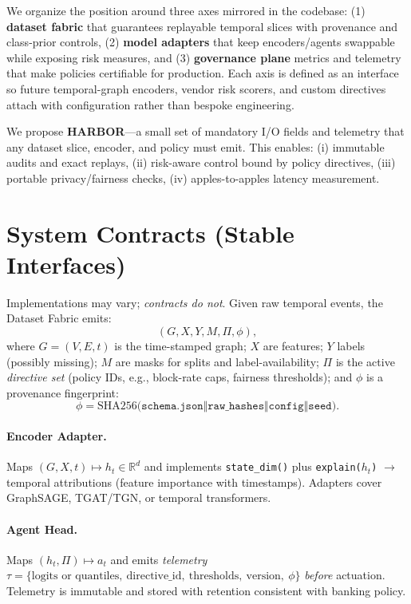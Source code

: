 \documentclass[letterpaper]{article}
\begin{document}
We organize the position around three axes mirrored in the codebase: (1) \textbf{dataset fabric} that guarantees replayable temporal slices with provenance and class-prior controls, (2) \textbf{model adapters} that keep encoders/agents swappable while exposing risk measures, and (3) \textbf{governance plane} metrics and telemetry that make policies certifiable for production. Each axis is defined as an interface so future temporal-graph encoders, vendor risk scorers, and custom directives attach with configuration rather than bespoke engineering.

We propose \textbf{\textsc{HARBOR}}---a small set of mandatory I/O fields and telemetry that any dataset slice, encoder, and policy must emit. This enables:
(i) immutable audits and exact replays,
(ii) risk-aware control bound by policy directives,
(iii) portable privacy/fairness checks,
(iv) apples-to-apples latency measurement.

\section{System Contracts (Stable Interfaces)}
\label{sec:contracts}
Implementations may vary; \emph{contracts do not}. Given raw temporal events, the Dataset Fabric emits:
\[
(G, X, Y, M, \Pi, \phi),
\]
where $G=(V,E,t)$ is the time-stamped graph; $X$ are features; $Y$ labels (possibly missing); $M$ are masks for splits and label-availability; $\Pi$ is the active \emph{directive set} (policy IDs, e.g., block-rate caps, fairness thresholds); and $\phi$ is a provenance fingerprint:
\[
\phi = \mathrm{SHA256}\big(\texttt{schema.json} \Vert \texttt{raw\_hashes} \Vert \texttt{config} \Vert \texttt{seed}\big).
\]

\paragraph{Encoder Adapter.}
Maps $(G,X,t)\mapsto h_t \in \mathbb{R}^d$ and implements
\texttt{state\_dim()} plus \texttt{explain($h_t$)} $\rightarrow$ temporal attributions (feature importance with timestamps).
Adapters cover GraphSAGE, TGAT/TGN, or temporal transformers.

\paragraph{Agent Head.}
Maps $(h_t,\Pi)\mapsto a_t$ and emits \emph{telemetry} 
$\tau=\{\text{logits or quantiles},\ \text{directive\_id},\ \text{thresholds},\ \text{version},\ \phi\}$ \emph{before} actuation. Telemetry is immutable and stored with retention consistent with banking policy.
\end{document}
